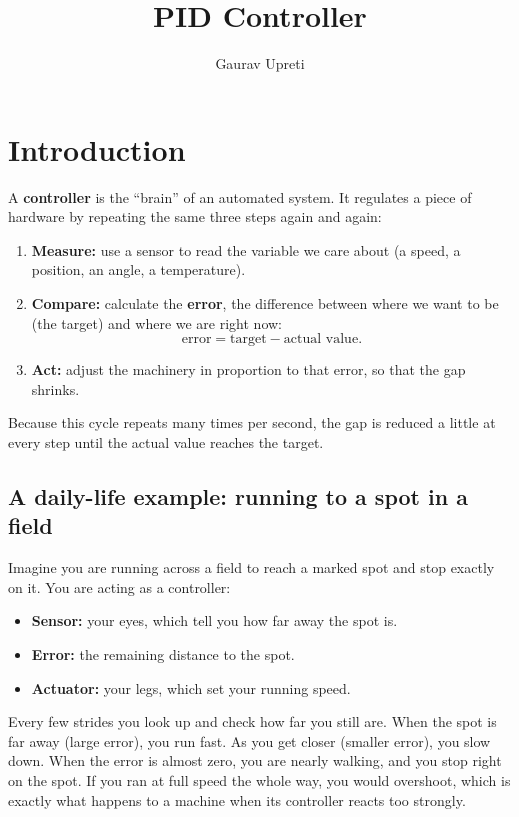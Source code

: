 \documentclass[]{article}
\title{PID Controller}
\author{Gaurav Upreti}
\begin{document}
\maketitle

\section{Introduction}
A \textbf{controller} is the ``brain'' of an automated system. It regulates a piece of hardware by repeating the same three steps again and again:
\begin{enumerate}
	\item \textbf{Measure:} use a sensor to read the variable we care about (a speed, a position, an angle, a temperature).
	\item \textbf{Compare:} calculate the \textbf{error}, the difference between where we want to be (the target) and where we are right now:
	\begin{equation}
		\text{error} = \text{target} - \text{actual value}.
	\end{equation}
	\item \textbf{Act:} adjust the machinery in proportion to that error, so that the gap shrinks.
\end{enumerate}
Because this cycle repeats many times per second, the gap is reduced a little at every step until the actual value reaches the target.

\subsection{A daily-life example: running to a spot in a field}
Imagine you are running across a field to reach a marked spot and stop exactly on it. You are acting as a controller:
\begin{itemize}
	\item \textbf{Sensor:} your eyes, which tell you how far away the spot is.
	\item \textbf{Error:} the remaining distance to the spot.
	\item \textbf{Actuator:} your legs, which set your running speed.
\end{itemize}
Every few strides you look up and check how far you still are. When the spot is far away (large error), you run fast. As you get closer (smaller error), you slow down. When the error is almost zero, you are nearly walking, and you stop right on the spot. If you ran at full speed the whole way, you would overshoot, which is exactly what happens to a machine when its controller reacts too strongly.
\end{document}

